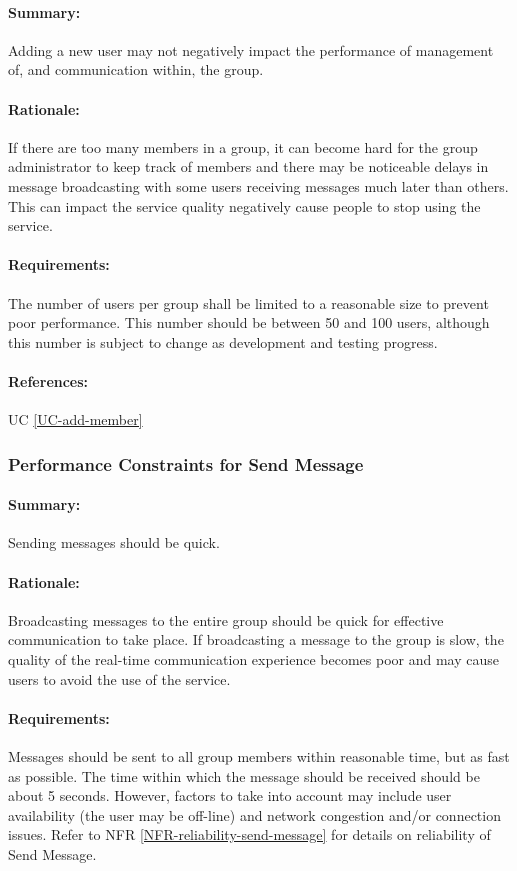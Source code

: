 \documentclass[11pt]{article}
\begin{document}
\paragraph{Summary:} Adding a new user may not negatively impact the performance of management of, and communication within, the group.
\paragraph{Rationale:} If there are too many members in a group, it can become hard for the group administrator to keep track of members and there may be noticeable delays in message broadcasting with some users receiving messages much later than others. This can impact the service quality negatively cause people to stop using the service.
\paragraph{Requirements:} The number of users per group shall be limited to a reasonable size to prevent poor performance. This number should be between 50 and 100 users, although this number is subject to change as development and testing progress.
\paragraph{References:} UC \ref{UC-add-member}

\subsubsection{Performance Constraints for Send Message} \label{NFR-performance-send-message}
\paragraph{Summary:} Sending messages should be quick.
\paragraph{Rationale:} Broadcasting messages to the entire group should be quick for effective communication to take place. If broadcasting a message to the group is slow, the quality of the real-time communication experience becomes poor and may cause users to avoid the use of the service. 
\paragraph{Requirements:} Messages should be sent to all group members within reasonable time, but as fast as possible. The time within which the message should be received should be about 5 seconds. However, factors to take into account may include user availability (the user may be off-line) and network congestion and/or connection issues. Refer to NFR \ref{NFR-reliability-send-message} for details on reliability of Send Message.
\end{document}
